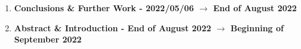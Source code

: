 \begin{enumerate}
\begin{enumerate}
            \item \label{itm:conclusion_write} \textbf{Conclusions \& Further Work - 2022/05/06  $\rightarrow$ End of August 2022}\\
            \item \label{itm:abstract_and_intro_write} \textbf{Abstract \& Introduction - End of August 2022  $\rightarrow$ Beginning of September 2022}\\
        \end{enumerate}
\end{enumerate}

